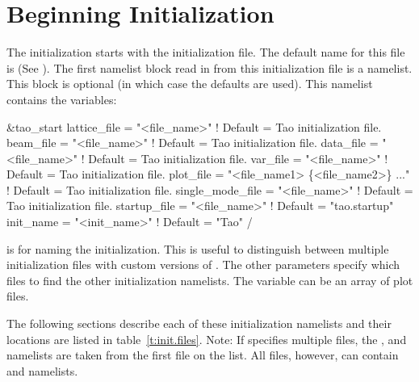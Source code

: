 \section{Beginning Initialization}
\label{s:init.global} 

The initialization starts with the \tao initialization file. The default name for
this file is  (See ).
The first namelist block read in from this initialization file is a 
 namelist. This block is optional (in which case the defaults
are used).  This namelist contains the variables:
\begin{example}
  &tao_start
    lattice_file      = "<file_name>"  ! Default = Tao initialization file.
    beam_file         = "<file_name>"  ! Default = Tao initialization file.
    data_file         = "<file_name>"  ! Default = Tao initialization file.
    var_file          = "<file_name>"  ! Default = Tao initialization file.
    plot_file         = "<file_name1> \{<file_name2>\} ..."  
                                       ! Default = Tao initialization file.
    single_mode_file  = "<file_name>"  ! Default = Tao initialization file.
    startup_file      = "<file_name>"  ! Default = "tao.startup"
    init_name         = "<init_name>"  ! Default = "Tao"
  /
\end{example}
 is for naming the initialization. This is useful to
distinguish between multiple initialization files with custom versions
of \tao. The other parameters specify which files to find the other
initialization namelists. The  variable can be an array
of plot files. 

The following sections describe each of these initialization namelists
and their locations are listed in table~\ref{t:init.files}. Note: If
 specifies multiple files, the ,
 and 
namelists are taken from the first file on the list. All files,
however, can contain  and
 namelists.

